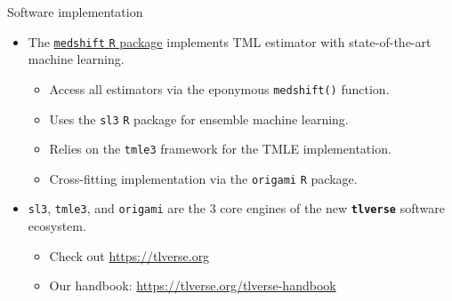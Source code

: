 \documentclass{beamer}
\begin{document}
\begin{frame}[c]{Software implementation}

\begin{center}
\begin{itemize}
  \itemsep2pt
  \item The \underline{\texttt{medshift} \texttt{R} package}
    \citep{hejazi2019medshift} implements TML estimator with state-of-the-art
    machine learning.
    \begin{itemize}
      \item Access all estimators via the eponymous \texttt{medshift()}
        function.
      \item Uses the \texttt{sl3} \texttt{R} package for ensemble machine
        learning.
      \item Relies on the \texttt{tmle3} framework for the TMLE implementation.
      \item Cross-fitting implementation via the \texttt{origami} \texttt{R}
        package.
    \end{itemize}
  \item \texttt{sl3}, \texttt{tmle3}, and \texttt{origami} are the 3 core
    engines of the new \textbf{\texttt{tlverse}} software ecosystem.
    \begin{itemize}
      \item Check out \url{https://tlverse.org}
      \item Our handbook: \url{https://tlverse.org/tlverse-handbook}
    \end{itemize}
\end{itemize}
\end{center}

\note{
}

\end{frame}


\setbeamercovered{}
\beamerdefaultoverlayspecification{}

\begin{frame}[c,allowframebreaks]{}

\scriptsize



\end{frame}

\end{document}
